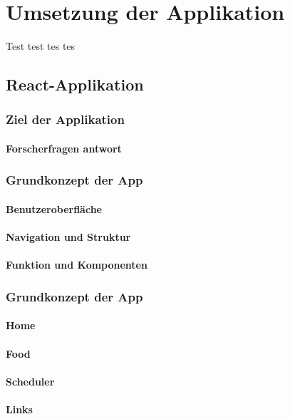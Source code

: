 \chapter{Umsetzung der Applikation}
Test test tes tes 

\section{React-Applikation}
\subsection{Ziel der Applikation}
\subsubsection{Forscherfragen antwort}

\subsection{Grundkonzept der App}
\subsubsection{Benutzeroberfläche}
\subsubsection{Navigation und Struktur}
\subsubsection{Funktion und Komponenten}

\subsection{Grundkonzept der App}
\subsubsection{Home}
\subsubsection{Food}
\subsubsection{Scheduler}
\subsubsection{Links}

